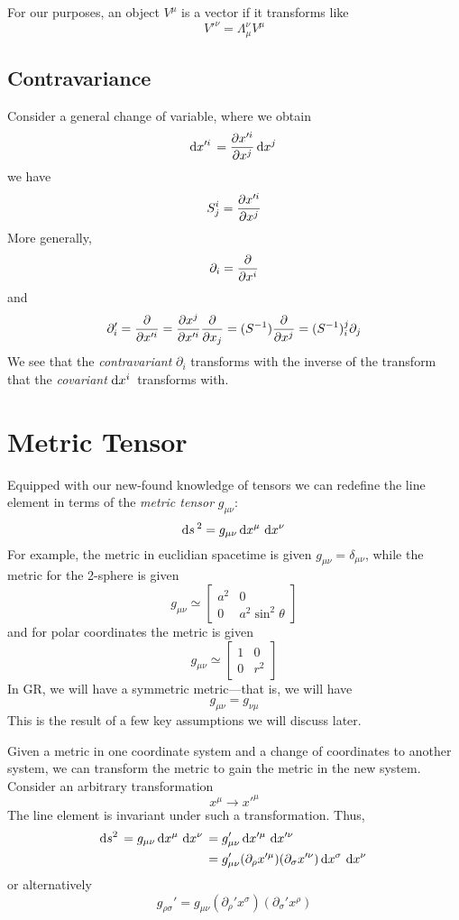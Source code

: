 For our purposes, an object \(V^\mu\) is a vector if it transforms like
\begin{equation}
	V'^\nu = \Lambda_\mu^\nu V^\mu
\end{equation}

\subsection{Contravariance}
Consider a general change of variable, where we obtain
\[\d{x'^i} = \pder{ x'^i}{x^j}\d{x^j}\]
we have
\[S^i_j=\frac{\partial x'^i}{\partial x^j}\]
More generally,
\[\partial_i =\frac{\partial }{\partial x^i}\]
and 
\[\partial_{i}' = \frac{\partial }{\partial x'^i} = \frac{\partial x^j}{\partial x'^i}\frac{\partial }{\partial x_j} = (S^{-1})\frac{\partial }{\partial x^j} = (S^{-1})_i^j\partial_j\]
We see that the \emph{contravariant} \(\partial_i\) transforms with the inverse of the transform that the \emph{covariant} \(\d{x^i}\) transforms with.

\section{Metric Tensor}
Equipped with our new-found knowledge of tensors we can redefine the line element in terms of the \emph{metric tensor} \(g_{\mu\nu}\):
\begin{equation}
	\d{s}^2 = g_{\mu\nu}\d{x^\mu}\d{x^\nu}
\end{equation}
For example, the metric in euclidian spacetime is given \(g_{\mu\nu} = \delta_{\mu\nu}\), while the metric for the 2-sphere is given
\[g_{\mu\nu}\simeq \begin{bmatrix}
	a^2 & 0 \\ 0 & a^2\sin^2\theta
\end{bmatrix}\]
and for polar coordinates the metric is given
\[g_{\mu\nu}\simeq \begin{bmatrix}
	1 & 0\\0& r^2
\end{bmatrix}\]
In GR, we will have a symmetric metric---that is, we will have 
\begin{equation}
	g_{\mu\nu} = g_{\nu\mu}
\end{equation}
This is the result of a few key assumptions we will discuss later.

Given a metric in one coordinate system and a change of coordinates to another system, we can transform the metric to gain the metric in the new system. Consider an arbitrary transformation
\[x^\mu\to x'^\mu\]
The line element is invariant under such a transformation. Thus,
\begin{align*}
	\d{s^2}= g_{\mu\nu}\d{x^\mu}\d{x^\nu} &= g'_{\mu\nu}\d{x'^\mu}\d{x'^\nu}\\
					      &=g'_{\mu\nu} (\partial_\rho x'^\mu )(\partial_\sigma x'^\nu) \d{x^\sigma}\d{x^\nu}\\
\end{align*}
or alternatively
\begin{equation}
	g_{\rho\sigma}'= g_{\mu\nu}(\partial_\rho' x^\sigma)(\partial_\sigma' x^\rho)
\end{equation}
